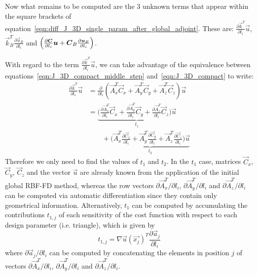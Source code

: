 
Now what remains to be computed are the $3$ unknown terms that appear within the square brackets of equation~\eqref{eqn:diff_J_3D_single_param_after_global_adjoint}. These are: $\frac{\partial \vec{k}^T}{\partial l_i}\vec{u}$, $\vec{k}_B^T \frac{\partial \vec{u}_B}{\partial l_i}$ and $\Bigl( \frac{\partial \vec{C}}{\partial l_i}\vec{u} + \vec{C}_B\frac{\partial \vec{u}_B}{\partial l_i} \Bigr)$.

\medskip
With regard to the term $\frac{\partial \vec{k}^T}{\partial l_i}\vec{u}$, we can take advantage of the equivalence between equations~\eqref{eqn:J_3D_compact_middle_step} and~\eqref{eqn:J_3D_compact} to write:
\begin{equation}
	\begin{split}
		\frac{\partial \vec{k}^T}{\partial l_i}\vec{u} & = \frac{\partial}{\partial l_i} (\vec{A}_x^T\vec{C}_x + \vec{A}_y^T\vec{C}_y + \vec{A}_z^T\vec{C}_z) \vec{u}  \\
													   & = \underbrace{\biggl( \frac{\partial \vec{A}_x^T}{\partial l_i}\vec{C}_x + \frac{\partial \vec{A}_y^T}{\partial l_i}\vec{C}_y + \frac{\partial \vec{A}_z^T}{\partial l_i}\vec{C}_z \biggr) \vec{u}}_{t_1}  \\
													   &\qquad + \underbrace{\biggl( \vec{A}_x^T\frac{\partial \vec{C}_x}{\partial l_i} + \vec{A}_y^T\frac{\partial \vec{C}_y}{\partial l_i} + \vec{A}_z^T\frac{\partial \vec{C}_z}{\partial l_i}\biggr) \vec{u}}_{t_2}
	\end{split}
\end{equation}
Therefore we only need to find the values of $t_1$ and $t_2$.
In the $t_1$ case, matrices $\vec{C}_x$, $\vec{C}_y$, $\vec{C}_z$ and the vector $\vec{u}$ are already known from the application of the initial global RBF-FD method, whereas the row vectors $\partial \vec{A}_x^T / \partial l_i$, $\partial \vec{A}_y^T / \partial l_i$ and $\partial \vec{A}_z^T / \partial l_i$ can be computed via automatic differentiation since they contain only geometrical information.
Alternatively, $t_1$ can be computed by accumulating the contributions $t_{1,j}$ of each sensitivity of the cost function with respect to each design parameter (i.e. triangle), which is given by
\begin{equation}
	t_{1,j} = \nabla\vec{u}(\vec{x_j})^T \frac{\partial \vec{a}_j}{\partial l_i}	
\end{equation}
where $\partial \vec{a}_j / \partial l_i$ can be computed by concatenating the elements in position $j$ of vectors $\partial \vec{A}_x^T / \partial l_i$, $\partial \vec{A}_y^T / \partial l_i$ and $\partial \vec{A}_z^T / \partial l_i$.

